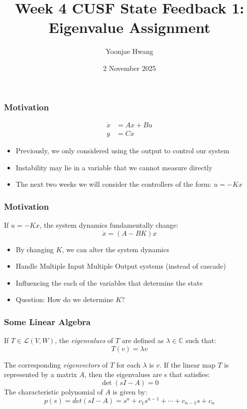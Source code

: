 \documentclass{beamer}
\title{Week 4 CUSF State Feedback 1: Eigenvalue Assignment}
\author{Yoonjae Hwang}
\date{2 November 2025}
\theoremstyle{remark}
\begin{document}
\frame{\titlepage}

\begin{frame}
\frametitle{Motivation}
\begin{equation}
    \begin{aligned}
        \dot{x} &= Ax + Bu \\
        y &= Cx 
    \end{aligned}
\end{equation}
\begin{itemize}
    \item Previously, we only considered using the output to control our system
    \item Instability may lie in a variable that we cannot measure directly
    \item The next two weeks we will consider the controllers of the form: $u = - Kx$
\end{itemize}
\end{frame}

\begin{frame}
\frametitle{Motivation}
If $u = - Kx$, the system dynamics fundamentally change:
\begin{equation}
    \dot{x} = (A-BK)x
\end{equation}


\begin{itemize}
    \item By changing $K$, we can alter the system dynamics
    \item Handle Multiple Input Multiple Output systems (instead of cascade)
    \item Influencing the each of the variables that determine the state
    \item Question: How do we determine $K$?
\end{itemize}
\end{frame}

\begin{frame}
\frametitle{Some Linear Algebra}
If $T \in \mathcal{L}(V,W)$, the \textsl{eigenvalues} of $T$ are defined as $\lambda \in \mathbb{C}$ such that: 
\begin{equation}
    T(v) = \lambda v
\end{equation}

The corresponding \textsl{eigenvectors} of $T$ for each $\lambda$ is $v$.
If the linear map $T$ is represented by a matrix $A$, then the eigenvalues are s that satisfies:
\begin{equation}
    \det(sI - A) = 0
\end{equation}
The characteristic polynomial of $A$ is given by: 
\begin{equation}
    p(s) = det(sI - A) = s^n + c_1 s^{n-1} + \cdots + c_{n-1} s + c_n
\end{equation}
\end{frame}
\end{document}
